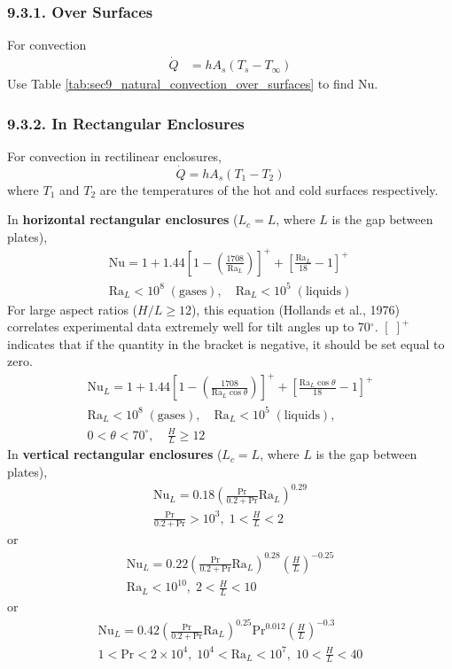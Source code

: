 \begin{multicols*}{2}
\subsubsection*{9.3.1. Over Surfaces}
For convection 
\begin{align*}
    \dot{Q} &= h A_s (T_s - T_\infty)
\end{align*}
Use Table \ref{tab:sec9_natural_convection_over_surfaces} to find Nu.
\subsubsection*{9.3.2. In Rectangular Enclosures}
For convection in rectilinear enclosures, 
\begin{equation*}
    \dot{Q} = h A_s (T_1 - T_2) 
\end{equation*}
where $T_1$ and $T_2$ are the temperatures of the hot and cold surfaces respectively.

In \textbf{horizontal rectangular enclosures} ($L_c = L$, where $L$ is the gap between plates),
\begin{gather*}
    \text{Nu} = 1 + 1.44 \left[1 - \left(\frac{1708}{\text{Ra}_L}\right)\right]^{+} + \left[\frac{\text{Ra}_L}{18} - 1\right]^{+}\\
    \text{Ra}_L < 10^8 \; (\text{gases}), \quad \text{Ra}_L < 10^{5} \; (\text{liquids})
\end{gather*}
For large aspect ratios ($H/L \geq 12$), this equation (Hollands et al., 1976) correlates experimental data extremely well for tilt angles up to 70$^{\circ}$.
$\left[ \;\right]^+$ indicates that if the quantity in the bracket is negative, it should be set equal to zero.
\begin{gather*}
    \text{Nu}_L = 1 + 1.44 \left[1 - \left(\frac{1708}{\text{Ra}_L \cos\theta}\right)\right]^{+} + \left[\frac{\text{Ra}_L \cos\theta}{18} - 1\right]^{+}\\
    \text{Ra}_L < 10^8 \; (\text{gases}), \quad \text{Ra}_L < 10^{5} \; (\text{liquids}), \\
    0 < \theta < 70^{\circ}, \quad \frac{H}{L} \geq 12
\end{gather*}
In \textbf{vertical rectangular enclosures} ($L_c = L$, where $L$ is the gap between plates),
\begin{gather*}
    \text{Nu}_L = 0.18\left(\frac{\text{Pr}}{0.2 + \text{Pr}} \text{Ra}_L \right)^{0.29}\\
    \frac{\text{Pr}}{0.2 + \text{Pr}} > 10^3, \; 1 < \frac{H}{L} < 2 
\end{gather*}
or 
\begin{gather*}
    \text{Nu}_L = 0.22\left(\frac{\text{Pr}}{0.2 + \text{Pr}} \text{Ra}_L \right)^{0.28} \left(\frac{H}{L}\right)^{-0.25}\\
    \text{Ra}_L < 10^{10}, \; 2 < \frac{H}{L} < 10
\end{gather*}
or
\begin{gather*}
    \text{Nu}_L = 0.42\left(\frac{\text{Pr}}{0.2 + \text{Pr}} \text{Ra}_L \right)^{0.25}\text{Pr}^{0.012} \left(\frac{H}{L}\right)^{-0.3}\\
    1 < \text{Pr} < 2 \times 10^4, \; 10^4 < \text{Ra}_L < 10^7, \; 10 < \frac{H}{L} < 40
\end{gather*}

\end{multicols*}
